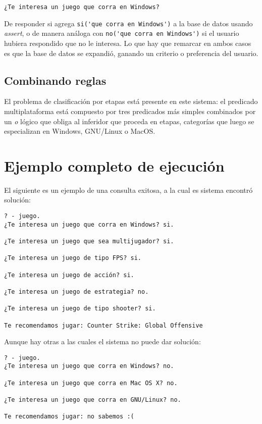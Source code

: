 \documentclass[11pt,oneside,a4paper]{article}
\begin{document}
\begin{verbatim}
¿Te interesa un juego que corra en Windows?
\end{verbatim}

De responder si agrega \verb|si('que corra en Windows')| a la base de datos usando 
\emph{assert}, o de manera análoga con \verb|no('que corra en Windows')| si el usuario
hubiera respondido que no le interesa. Lo que hay que remarcar en ambos casos 
es que la base de datos se expandió, ganando un criterio o preferencia del usuario.

\subsection{Combinando reglas} %

El problema de clasificación por etapas está presente en este sistema: el predicado 
multiplataforma está compuesto por tres predicados más simples
combinados por un \emph{o} lógico que obliga al inferidor que proceda en etapas, 
categorías que luego se especializan en Windows, GNU/Linux o MacOS. 


\newpage
\section{Ejemplo completo de ejecución}

El siguiente es un ejemplo de una consulta exitosa, a la cual es sistema encontró
solución:

\begin{verbatim}
? - juego.
¿Te interesa un juego que corra en Windows? si.

¿Te interesa un juego que sea multijugador? si.

¿Te interesa un juego de tipo FPS? si.

¿Te interesa un juego de acción? si.

¿Te interesa un juego de estrategia? no.

¿Te interesa un juego de tipo shooter? si.

Te recomendamos jugar: Counter Strike: Global Offensive
\end{verbatim}

Aunque hay otras a las cuales el sistema no puede dar solución:

\begin{verbatim}
? - juego.
¿Te interesa un juego que corra en Windows? no.

¿Te interesa un juego que corra en Mac OS X? no.

¿Te interesa un juego que corra en GNU/Linux? no.

Te recomendamos jugar: no sabemos :(
\end{verbatim}
\end{document}
